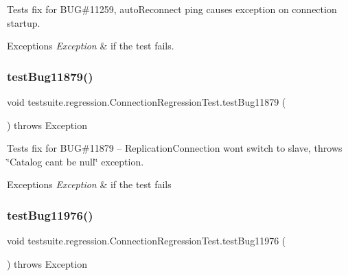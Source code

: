 Tests fix for B\+UG\#11259, auto\+Reconnect ping causes exception on connection startup.


\begin{DoxyExceptions}{Exceptions}
{\em Exception} & if the test fails. \\
\hline
\end{DoxyExceptions}
\mbox{\label{classtestsuite_1_1regression_1_1_connection_regression_test_aa63c56bf945c18c91d9f4486fdb6ab67}} 
\subsubsection{\texorpdfstring{test\+Bug11879()}{testBug11879()}}
{\footnotesize\ttfamily void testsuite.\+regression.\+Connection\+Regression\+Test.\+test\+Bug11879 (\begin{DoxyParamCaption}{ }\end{DoxyParamCaption}) throws Exception}

Tests fix for B\+UG\#11879 -- Replication\+Connection won\textquotesingle{}t switch to slave, throws \char`\"{}\+Catalog can\textquotesingle{}t be null\char`\"{} exception.


\begin{DoxyExceptions}{Exceptions}
{\em Exception} & if the test fails \\
\hline
\end{DoxyExceptions}
\mbox{\label{classtestsuite_1_1regression_1_1_connection_regression_test_a9c63a889bf88b7f4ec84d455614d8da0}} 
\subsubsection{\texorpdfstring{test\+Bug11976()}{testBug11976()}}
{\footnotesize\ttfamily void testsuite.\+regression.\+Connection\+Regression\+Test.\+test\+Bug11976 (\begin{DoxyParamCaption}{ }\end{DoxyParamCaption}) throws Exception}

